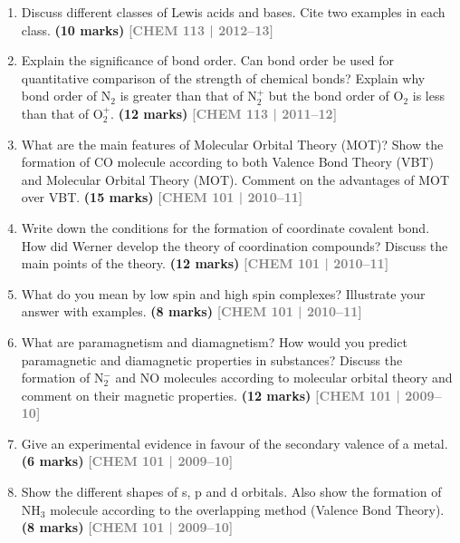 \documentclass[12pt,a3paper]{article}
\newcommand{\yr}[1]{\hfill\textcolor{gray}{\small\textbf{[#1]}}}
\newcommand{\mk}[1]{\textcolor{orange!70!black}{\small\textbf{(#1 marks)}}}
\begin{document}
\begin{enumerate}
\item Discuss different classes of Lewis acids and bases. Cite two examples in each class. \mk{10}
\yr{CHEM 113 | 2012--13}






\item Explain the significance of bond order. Can bond order be used for quantitative comparison of the strength of chemical bonds? Explain why bond order of N$_2$ is greater than that of N$_2^+$ but the bond order of O$_2$ is less than that of O$_2^+$. \mk{12}
\yr{CHEM 113 | 2011--12}



\item What are the main features of Molecular Orbital Theory (MOT)? Show the formation of CO molecule according to both Valence Bond Theory (VBT) and Molecular Orbital Theory (MOT). Comment on the advantages of MOT over VBT. \mk{15}
\yr{CHEM 101 | 2010--11}



\item Write down the conditions for the formation of coordinate covalent bond. How did Werner develop the theory of coordination compounds? Discuss the main points of the theory. \mk{12}
\yr{CHEM 101 | 2010--11}



\item What do you mean by low spin and high spin complexes? Illustrate your answer with examples. \mk{8}
\yr{CHEM 101 | 2010--11}



\item What are paramagnetism and diamagnetism? How would you predict paramagnetic and diamagnetic properties in substances? Discuss the formation of N$_2^-$ and NO molecules according to molecular orbital theory and comment on their magnetic properties. \mk{12}
\yr{CHEM 101 | 2009--10}



\item Give an experimental evidence in favour of the secondary valence of a metal. \mk{6}
\yr{CHEM 101 | 2009--10}



\item Show the different shapes of s, p and d orbitals. Also show the formation of NH$_3$ molecule according to the overlapping method (Valence Bond Theory). \mk{8}
\yr{CHEM 101 | 2009--10}




\end{enumerate}
\end{document}
